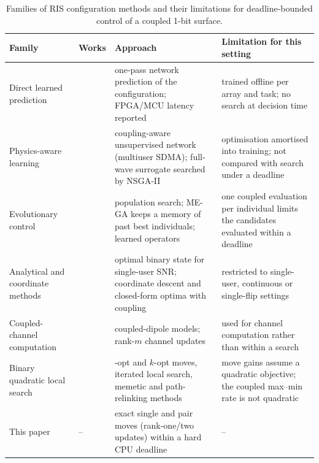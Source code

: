 \documentclass[runningheads]{llncs}
\begin{document}
\begin{table}[t]
\centering
\caption{Families of RIS configuration methods and their limitations for deadline-bounded control of a coupled 1-bit surface.}\label{tab:related}
\scriptsize\setlength{\tabcolsep}{3pt}\renewcommand{\arraystretch}{1.05}
\begin{tabular}{@{}>{\raggedright\arraybackslash}p{}>{\raggedright\arraybackslash}p{}>{\raggedright\arraybackslash}p{}>{\raggedright\arraybackslash}p{}@{}}
\toprule
Family & Works & Approach & Limitation for this setting\\
\midrule
Direct learned prediction & \cite{martin2024hardware,padial2026accelerating,urbinati2026ondevice,xu2022robust} & one-pass network prediction of the configuration; FPGA/MCU latency reported & trained offline per array and task; no search at decision time\\
Physics-aware learning & \cite{peng2025risnet,liu2026physics} & coupling-aware unsupervised network (multiuser SDMA); full-wave surrogate searched by NSGA-II & optimisation amortised into training; not compared with search under a deadline\\
Evolutionary control & \cite{stylianopoulos2022dlga,radar2024onebitga,zardi2024memory} \cite{deb2002fast,lange2023discovering} & population search; ME-GA keeps a memory of past best individuals; learned operators & one coupled evaluation per individual limits the candidates evaluated within a deadline\\
Analytical and coordinate methods & \cite{zhang2022configuring,qian2021mutual,hammami2026statistical,nerini2026global} & optimal binary state for single-user SNR; coordinate descent and closed-form optima with coupling & restricted to single-user, continuous or single-flip settings\\
Coupled-channel computation & \cite{faqiri2023physfad,prodhomme2023efficient} & coupled-dipole models; rank-$m$ channel updates & used for channel computation rather than within a search\\
Binary quadratic local search & \cite{merz2002bqp,lourenco2010ils,merz2004memetic} \cite{glover2010ddts,lu2010hybrid,wang2012pathrelinking} & 1-opt and $k$-opt moves, iterated local search, memetic and path-relinking methods & move gains assume a quadratic objective; the coupled max--min rate is not quadratic\\
\midrule
This paper & -- & exact single and pair moves (rank-one/two updates) within a hard CPU deadline & --\\
\bottomrule
\end{tabular}
\end{table}
\end{document}
